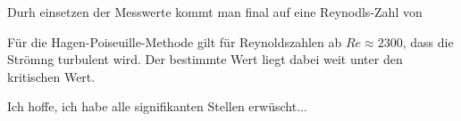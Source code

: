 
Durh einsetzen der Messwerte kommt man final auf eine Reynodls-Zahl von


Für die Hagen-Poiseuille-Methode gilt für Reynoldszahlen ab $Re \approx 2300$, dass die Strömng turbulent wird. Der bestimmte Wert liegt dabei weit unter den kritischen Wert. 


\small{Ich hoffe, ich habe alle signifikanten Stellen erwüscht...}
